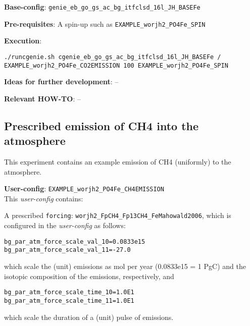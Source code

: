 \documentclass[10pt,twoside]{article}
\begin{document}
\noindent \textbf{Base-config}: \texttt{genie\_eb\_go\_gs\_ac\_bg\_itfclsd\_16l\_JH\_BASEFe}

\noindent \textbf{Pre-requisites}: A spin-up such as \texttt{EXAMPLE\_worjh2\_PO4Fe\_SPIN}

\noindent \textbf{Execution}:
\vspace{-5pt}\begin{verbatim}
./runcgenie.sh cgenie_eb_go_gs_ac_bg_itfclsd_16l_JH_BASEFe / 
EXAMPLE_worjh2_PO4Fe_CO2EMISSION 100 EXAMPLE_worjh2_PO4Fe_SPIN
\end{verbatim}\vspace{-5pt}

\noindent \textbf{Ideas for further development}: --

\noindent \textbf{Relevant HOW-TO}: --



\subsection{Prescribed emission of CH4 into the atmosphere}\label{EXAMPLE_worjh2_PO4Fe_CH4EMISSION}

This experiment contains an example emission of CH4 (uniformly) to the atmosphere.

\noindent \textbf{User-config}: \texttt{EXAMPLE\_worjh2\_PO4Fe\_CH4EMISSION}
\\ This \textit{user-config} contains:
\begin{compactitem}
	\item A prescribed \texttt{forcing}: \texttt{worjh2\_FpCH4\_Fp13CH4\_FeMahowald2006}, which is configured in the \textit{user-config} as follows:
\begin{compactenum}
	\item 
	\begin{verbatim}
bg_par_atm_force_scale_val_10=0.0833e15
bg_par_atm_force_scale_val_11=-27.0
		\end{verbatim}
		which scale the (unit) emissions as mol per year (0.0833e15 = 1 PgC) and the isotopic composition of the emissions, respectively, and
	\item 
	\begin{verbatim}
bg_par_atm_force_scale_time_10=1.0E1
bg_par_atm_force_scale_time_11=1.0E1
		\end{verbatim}
		which scale the duration of a (unit) pulse of emissions.
\end{compactenum}
\end{compactitem}
\end{document}
